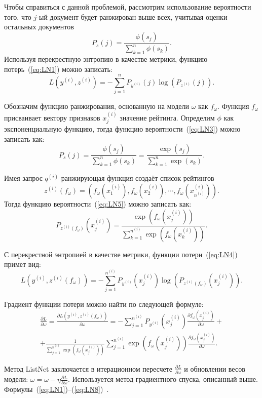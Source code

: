 Чтобы справиться с данной проблемой, рассмотрим использование вероятности того, что $j$-ый документ будет ранжирован выше всех, учитывая оценки остальных документов
\begin{equation}
	\label{eq:LN3}
	P_s(j)=\frac{\phi(s_j)}{\sum_{k=1}^n \phi(s_k)} .
\end{equation}
Используя перекрестную энтропию в качестве метрики, функцию потерь~(\ref{eq:LN1}) можно записать:
\begin{equation}
	\label{eq:LN4}
	L(y^{(i)}, z^{(i)})=-\sum_{j=1}^n P_{y^{(i)}}(j) \log (P_{z^{(i)}}(j)).
\end{equation}

Обозначим функцию ранжирования, основанную на модели $\omega$ как $f_\omega$. Функция $f_\omega$ присваивает вектору признаков $x_j^{(i)}$ значение рейтинга. Определим $\phi$ как экспоненциальную функцию, тогда функцию вероятности~(\ref{eq:LN3}) можно записать как:
\begin{equation}
	\label{eq:LN5}
	P_s(j)=\frac{\phi(s_j)}{\sum_{k=1}^n \phi(s_k)}=\frac{\exp (s_j)}{\sum_{k=1}^n \exp (s_k)}.
\end{equation}

Имея запрос $q^{(i)}$ ранжирующая функция создаёт список рейтингов \[z^{(i)}(f_\omega)=(f_\omega(x_1^{(i)}), f_\omega(x_2^{(i)}), \cdots, f_\omega(x_{n^{(i)}}^{(i)})).
\]
Тогда функцию вероятности~(\ref{eq:LN5}) можно записать как:
\begin{equation}
	\label{eq:LN6}
	P_{z^{(i)}(f_\omega)}(x_j^{(i)})=\frac{\exp (f_\omega(x_j^{(i)}))}{\sum_{k=1}^{n^{(i)}} \exp (f_\omega(x_k^{(i)}))}.
\end{equation}

С перекрестной энтропией в качестве метрики, функции потери~(\ref{eq:LN4}) примет вид:
\begin{equation}
	\label{eq:LN7}
	L(y^{(i)}, z^{(i)}(f_\omega))=-\sum_{j=1}^{n^{(i)}} P_{y^{(i)}}(x_j^{(i)}) \log (P_{z^{(i)}(f_\omega)}(x_j^{(i)})).
\end{equation}

Градиент функции потери можно найти по следующей формуле:
\begin{equation}
	\label{eq:LN8}
	\begin{aligned}
		\frac{\partial L}{\partial \omega}= 
		\frac{\partial L(y^{(i)}, z^{(i)}(f_\omega))}{\partial \omega}=-\sum_{j=1}^{n^{(i)}} P_{y^{(i)}}(x_j^{(i)}) \frac{\partial f_\omega(x_j^{(i)})}{\partial \omega}+ \\
		+\frac{1}{\sum_{j=1}^{n^{(i)}} \exp (f_\omega(x_j^{(i)}))} \sum_{j=1}^{n^{(i)}} \exp (f_\omega(x_j^{(i)})) \frac{\partial f_\omega(x_j^{(i)})}{\partial \omega}.
	\end{aligned}
\end{equation}


Метод ListNet заключается в итерационном пересчете $\frac{\partial L}{\partial \omega}$ и обновлении весов модели: $\omega = \omega - \eta\frac{\partial L}{\partial \omega}$. Используется метод градиентного спуска, описанный выше. Формулы~(\ref{eq:LN1})--(\ref{eq:LN8})~\cite{ListNet}.